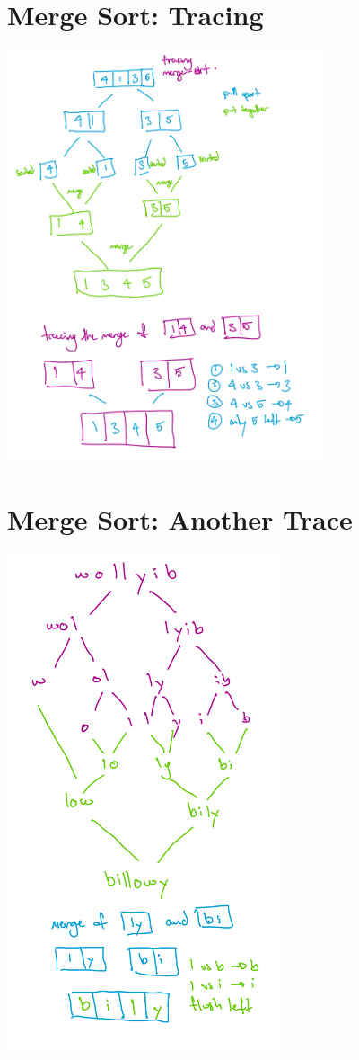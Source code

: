 \documentclass[twoside=false,DIV=14]{scrartcl}
\begin{document}
\section{Merge Sort: Tracing}
\includegraphics[width=0.7\textwidth]{small_merge_trace.jpeg}

\section{Merge Sort: Another Trace}
\includegraphics[width=0.6\textwidth]{mid_merge_trace.jpeg}
\end{document}
